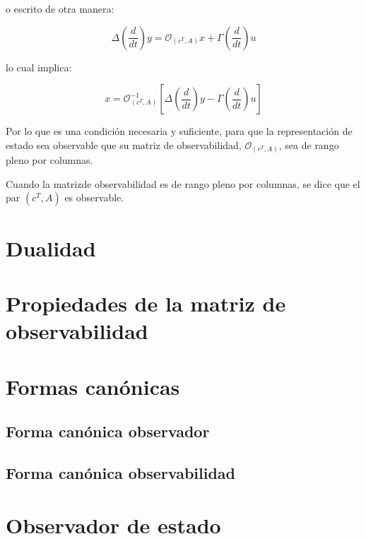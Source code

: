 	o escrito de otra manera:

	\begin{equation*}
		\Delta \left( \frac{d}{dt} \right) y = \mathcal{O}_{(c^T, A)} x + \Gamma \left( \frac{d}{dt} \right) u
	\end{equation*}

	lo cual implica:

	\begin{equation}
		x = \mathcal{O}_{(c^T, A)}^{-1} \left[ \Delta \left( \frac{d}{dt} \right) y - \Gamma \left( \frac{d}{dt} \right) u \right]
	\end{equation}

	Por lo que es una condición necesaria y suficiente, para que la representación de estado sea observable que su matriz de observabilidad, $\mathcal{O}_{(c^T, A)}$, sea de rango pleno por columnas.

	Cuando la matrizde observabilidad es de rango pleno por columnas, se dice que el par $(c^T, A)$ es observable.

    \newpage
    \section{Dualidad}

    \newpage
    \section{Propiedades de la matriz de observabilidad}

    \newpage
    \section{Formas canónicas}
        \subsection{Forma canónica observador}
        \subsection{Forma canónica observabilidad}

    \newpage
    \section{Observador de estado}
